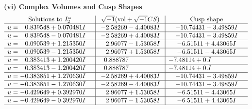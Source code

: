 \documentclass[1p]{elsarticle_modified}
\theoremstyle{definition}
\newcommand{\I}{\sqrt{-1}}
\begin{document}
\newpage\flushleft \textbf{(vi) Complex Volumes and Cusp Shapes}
$$\begin{array}{c|c|c}  
\text{Solutions to }I^u_{2}& \I (\text{vol} + \sqrt{-1}CS) & \text{Cusp shape}\\
 \hline 
\begin{aligned}
u &= \phantom{-}0.839548 + 0.070481 I\end{aligned}
 & -2.58269 - 4.40083 I & -10.74431 + 3.49859 I \\ \hline\begin{aligned}
u &= \phantom{-}0.839548 - 0.070481 I\end{aligned}
 & -2.58269 + 4.40083 I & -10.74431 - 3.49859 I \\ \hline\begin{aligned}
u &= \phantom{-}0.090539 + 1.215350 I\end{aligned}
 & \phantom{-}2.96077 - 1.53058 I & -6.51511 + 4.43065 I \\ \hline\begin{aligned}
u &= \phantom{-}0.090539 - 1.215350 I\end{aligned}
 & \phantom{-}2.96077 + 1.53058 I & -6.51511 - 4.43065 I \\ \hline\begin{aligned}
u &= \phantom{-}0.383413 + 1.200420 I\end{aligned}
 & \phantom{-}0.888787\phantom{ +0.000000I} & -7.48114 + 0. I\phantom{ +0.000000I} \\ \hline\begin{aligned}
u &= \phantom{-}0.383413 - 1.200420 I\end{aligned}
 & \phantom{-}0.888787\phantom{ +0.000000I} & -7.48114 + 0. I\phantom{ +0.000000I} \\ \hline\begin{aligned}
u &= -0.383851 + 1.270630 I\end{aligned}
 & -2.58269 + 4.40083 I & -10.74431 - 3.49859 I \\ \hline\begin{aligned}
u &= -0.383851 - 1.270630 I\end{aligned}
 & -2.58269 - 4.40083 I & -10.74431 + 3.49859 I \\ \hline\begin{aligned}
u &= -0.429649 + 0.392970 I\end{aligned}
 & \phantom{-}2.96077 + 1.53058 I & -6.51511 - 4.43065 I \\ \hline\begin{aligned}
u &= -0.429649 - 0.392970 I\end{aligned}
 & \phantom{-}2.96077 - 1.53058 I & -6.51511 + 4.43065 I\\
 \hline 
 \end{array}$$\newpage
\end{document}
